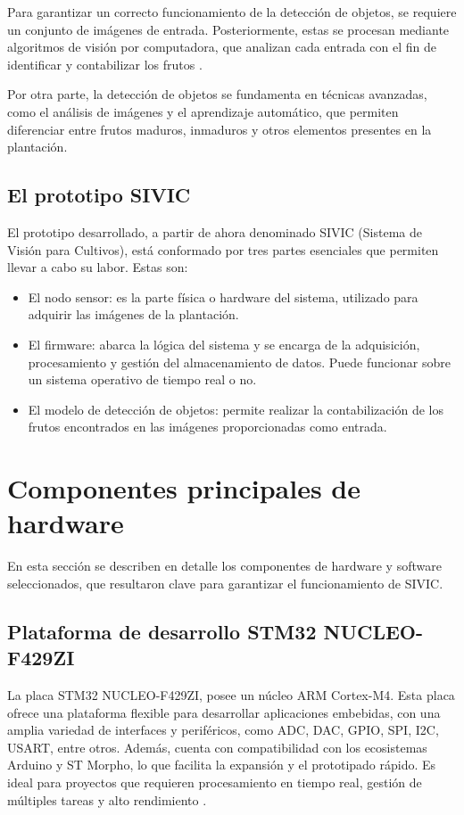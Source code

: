 Para garantizar un correcto funcionamiento de la detección de objetos, se requiere un conjunto de imágenes de entrada. Posteriormente, estas se procesan mediante algoritmos de visión por computadora, que analizan cada entrada con el fin de identificar y contabilizar los frutos \citep{Montiel2019}.

Por otra parte, la detección de objetos se fundamenta en técnicas avanzadas, como el análisis de imágenes y el aprendizaje automático, que permiten diferenciar entre frutos maduros, inmaduros y otros elementos presentes en la plantación.

\newpage

\subsection{El prototipo SIVIC}

El prototipo desarrollado, a partir de ahora denominado SIVIC (Sistema de Visión para Cultivos), está conformado por tres partes esenciales que permiten llevar a cabo su labor. Estas son:
\begin{itemize}
\item El nodo sensor: es la parte física o hardware del sistema, utilizado para adquirir las imágenes de la plantación.
\item El firmware: abarca la lógica del sistema y se encarga de la adquisición, procesamiento y gestión del almacenamiento de datos. Puede funcionar sobre un sistema operativo de tiempo real o no.
\item El modelo de detección de objetos: permite realizar la contabilización de los frutos encontrados en las imágenes proporcionadas como entrada.
\end{itemize}

\section{Componentes principales de hardware}

En esta sección se describen en detalle los componentes de hardware y software seleccionados, que resultaron clave para garantizar el funcionamiento de SIVIC.

\subsection{Plataforma de desarrollo STM32 NUCLEO-F429ZI}
\label{subsec:F429ZI}

La placa STM32 NUCLEO-F429ZI, posee un núcleo ARM Cortex-M4. Esta placa ofrece una plataforma flexible para desarrollar aplicaciones embebidas, con una amplia variedad de interfaces y periféricos, como ADC, DAC, GPIO, SPI, I2C, USART, entre otros. Además, cuenta con compatibilidad con los ecosistemas Arduino y ST Morpho, lo que facilita la expansión y el prototipado rápido. Es ideal para proyectos que requieren procesamiento en tiempo real, gestión de múltiples tareas y alto rendimiento \citep{WEBSITE:Itt2024}.

